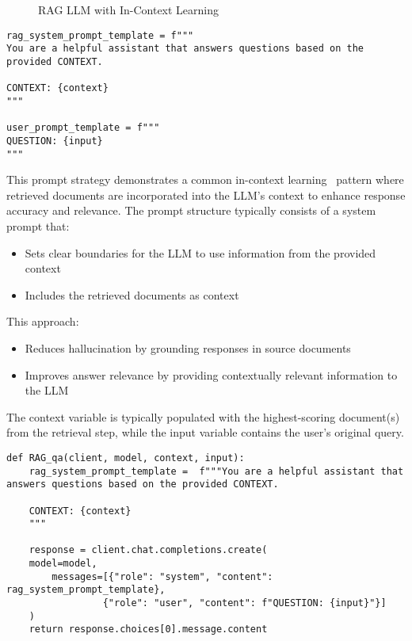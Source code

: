 \begin{figure}[H]
\centering

\caption{RAG LLM with In-Context Learning}
\label{fig:incontext}
\end{figure}

\begin{verbatim}
rag_system_prompt_template = f"""
You are a helpful assistant that answers questions based on the provided CONTEXT.

CONTEXT: {context}
"""

user_prompt_template = f"""
QUESTION: {input}
"""
\end{verbatim}

This prompt strategy demonstrates a common in-context learning~ pattern where retrieved documents are incorporated into the LLM's context to enhance response accuracy and relevance. The prompt structure typically consists of a system prompt that:

\begin{itemize}
    \item Sets clear boundaries for the LLM to use information from the provided context
    \item Includes the retrieved documents as context
\end{itemize}

This approach:
\begin{itemize}
    \item Reduces hallucination by grounding responses in source documents
    \item Improves answer relevance by providing contextually relevant information to the LLM
\end{itemize}
The context variable is typically populated with the highest-scoring document(s) from the retrieval step, while the input variable contains the user's original query.

\begin{verbatim}
def RAG_qa(client, model, context, input):
    rag_system_prompt_template =  f"""You are a helpful assistant that answers questions based on the provided CONTEXT.

    CONTEXT: {context}
    """
    
    response = client.chat.completions.create(
    model=model,
        messages=[{"role": "system", "content": rag_system_prompt_template},
                 {"role": "user", "content": f"QUESTION: {input}"}]
    )
    return response.choices[0].message.content
\end{verbatim}

